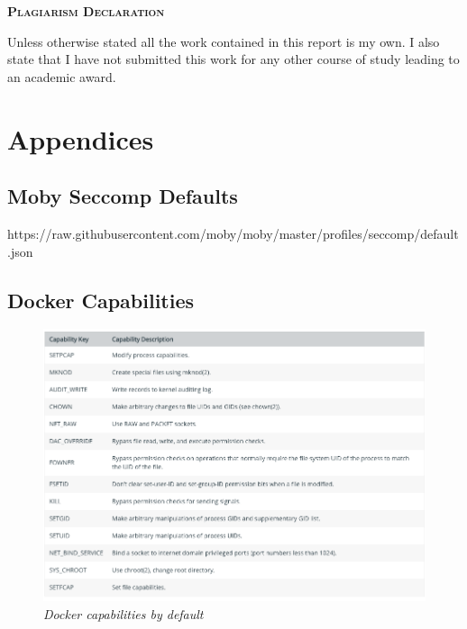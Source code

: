 \documentclass{article}
\begin{document}
\onehalfspacing
\hypersetup{pageanchor=false}

\hypersetup{pageanchor=true}
\clearpage
\begin{center}
\begin{minipage}{\textwidth}
  
  {\scshape\large \textbf{Plagiarism Declaration}\par}
  \vspace{1cm}
  Unless otherwise stated all the work contained in this report is my own.  I also state that I have not submitted this work for any other course of study leading to an academic award.
\end{minipage}
\end{center}
\vfill %
\clearpage

\tableofcontents

\newpage


\newpage


\newpage


\newpage


\newpage


\appendix
\section*{Appendices}
\renewcommand{\thesubsection}{\Alph{subsection}}

\subsection{Moby Seccomp Defaults} 
\label{appendix:seccomp}
https://raw.githubusercontent.com/moby/moby/master/profiles/seccomp/default.json

\subsection{Docker Capabilities}
\label{appendix:capab}
\begin{figure}[!ht]
\centering
\includegraphics*[width=\textwidth]{images/term5.png}
\caption{\em Docker capabilities by default}
\end{figure}
\newpage
\end{document}
